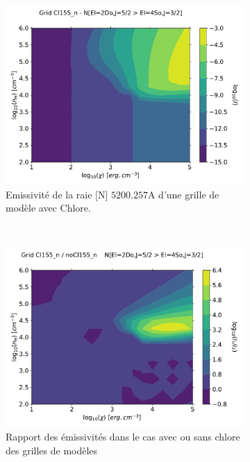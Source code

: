 \begin{figure}[!htbp]
    \centering
    \begin{subfigure}[t]{0.49\textwidth} %
        \centering \includegraphics[trim = {0 0 0 1cm},clip,width=1\textwidth]{figure/Cl/gridModelEmiss/mapI_N.pdf}
        \caption{Emissivité de la raie [N] $5200.257 \mathrm{A}$ d'une grille de modèle avec Chlore.}
    \end{subfigure}
    ~ 
    \begin{subfigure}[t]{0.49\textwidth} %
        \centering \includegraphics[trim = {0 0 0 1cm},clip,width=1\textwidth]{figure/Cl/gridModelEmiss/map_Cl155_n_noCl155_nI_N.pdf}
        \caption{Rapport des émissivités dans le cas avec ou sans chlore des grilles de modèles}
    \end{subfigure}
    
    \caption{}
    \label{fig:Cl:gridModelEmiss:N}
\end{figure}


